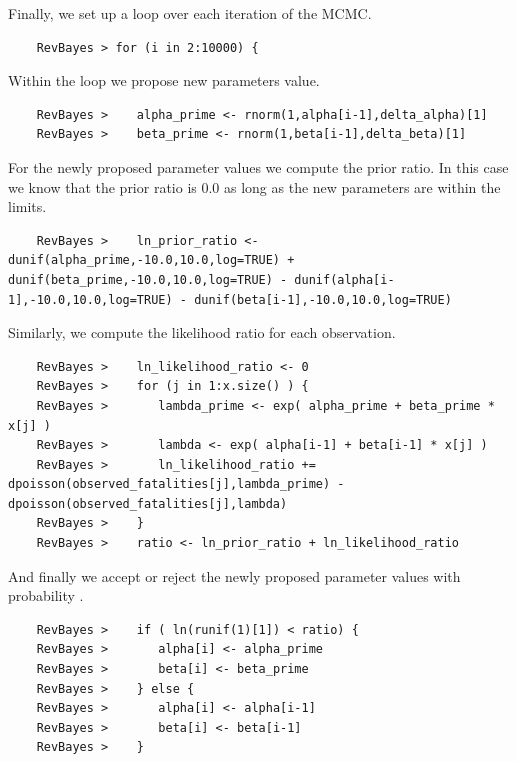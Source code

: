 Finally, we set up a  loop over each iteration of the MCMC.
{\tt \begin{snugshade*}
\begin{lstlisting}    
    RevBayes > for (i in 2:10000) {
\end{lstlisting}
\end{snugshade*}}
Within the  loop we propose new parameters value.
{\tt \begin{snugshade*}
\begin{lstlisting}    
    RevBayes >    alpha_prime <- rnorm(1,alpha[i-1],delta_alpha)[1]
    RevBayes >    beta_prime <- rnorm(1,beta[i-1],delta_beta)[1]
\end{lstlisting}
\end{snugshade*}}
For the newly proposed parameter values we compute the prior ratio.
In this case we know that the prior ratio is 0.0 as long as the new parameters are within the limits.
{\tt \begin{snugshade*}
\begin{lstlisting}    
    RevBayes >    ln_prior_ratio <- dunif(alpha_prime,-10.0,10.0,log=TRUE) + dunif(beta_prime,-10.0,10.0,log=TRUE) - dunif(alpha[i-1],-10.0,10.0,log=TRUE) - dunif(beta[i-1],-10.0,10.0,log=TRUE)
\end{lstlisting}
\end{snugshade*}}
Similarly, we compute the likelihood ratio for each observation.
{\tt \begin{snugshade*}
\begin{lstlisting}    
    RevBayes >    ln_likelihood_ratio <- 0
    RevBayes >    for (j in 1:x.size() ) {
    RevBayes >       lambda_prime <- exp( alpha_prime + beta_prime * x[j] )
    RevBayes >       lambda <- exp( alpha[i-1] + beta[i-1] * x[j] )
    RevBayes >       ln_likelihood_ratio += dpoisson(observed_fatalities[j],lambda_prime) - dpoisson(observed_fatalities[j],lambda)
    RevBayes >    }
    RevBayes >    ratio <- ln_prior_ratio + ln_likelihood_ratio
\end{lstlisting}
\end{snugshade*}}
And finally we accept or reject the newly proposed parameter values with probability .
{\tt \begin{snugshade*}
\begin{lstlisting}    
    RevBayes >    if ( ln(runif(1)[1]) < ratio) {
    RevBayes >       alpha[i] <- alpha_prime
    RevBayes >       beta[i] <- beta_prime
    RevBayes >    } else {
    RevBayes >       alpha[i] <- alpha[i-1]
    RevBayes >       beta[i] <- beta[i-1]
    RevBayes >    }
\end{lstlisting}
\end{snugshade*}}
